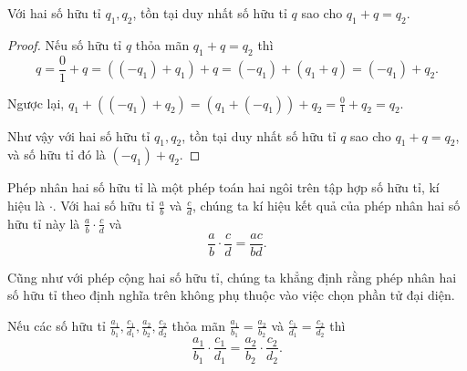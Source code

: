 \begin{theorem}\label{theorem:solution-of-linear-equation-part-1}
	Với hai số hữu tỉ $q_{1}, q_{2}$, tồn tại duy nhất số hữu tỉ $q$ sao cho $q_{1} + q = q_{2}$.
\end{theorem}

\begin{proof}
	Nếu số hữu tỉ $q$ thỏa mãn $q_{1} + q = q_{2}$ thì
	\[
		q = \frac{0}{1} + q = ((-q_{1}) + q_{1}) + q = (-q_{1}) + (q_{1} + q) = (-q_{1}) + q_{2}.
	\]

	Ngược lại, $q_{1} + ((-q_{1}) + q_{2}) = (q_{1} + (-q_{1})) + q_{2} = \frac{0}{1} + q_{2} = q_{2}$.

	Như vậy với hai số hữu tỉ $q_{1}, q_{2}$, tồn tại duy nhất số hữu tỉ $q$ sao cho $q_{1} + q = q_{2}$, và số hữu tỉ đó là $(-q_{1}) + q_{2}$.
\end{proof}

\begin{definition}
	Phép nhân hai số hữu tỉ là một phép toán hai ngôi trên tập hợp số hữu tỉ, kí hiệu là $\cdot$. Với hai số hữu tỉ $\frac{a}{b}$ và $\frac{c}{d}$, chúng ta kí hiệu kết quả của phép nhân hai số hữu tỉ này là $\frac{a}{b}\cdot\frac{c}{d}$ và
	\[
		\frac{a}{b}\cdot\frac{c}{d} = \frac{ac}{bd}.
	\]
\end{definition}

Cũng như với phép cộng hai số hữu tỉ, chúng ta khẳng định rằng phép nhân hai số hữu tỉ theo định nghĩa trên không phụ thuộc vào việc chọn phần tử đại diện.
\begin{proposition}
	Nếu các số hữu tỉ $\frac{a_{1}}{b_{1}}, \frac{c_{1}}{d_{1}}, \frac{a_{2}}{b_{2}}, \frac{c_{2}}{d_{2}}$ thỏa mãn $\frac{a_{1}}{b_{1}} = \frac{a_{2}}{b_{2}}$ và $\frac{c_{1}}{d_{1}} = \frac{c_{2}}{d_{2}}$ thì
	\[
		\frac{a_{1}}{b_{1}}\cdot\frac{c_{1}}{d_{1}} = \frac{a_{2}}{b_{2}}\cdot\frac{c_{2}}{d_{2}}.
	\]
\end{proposition}

